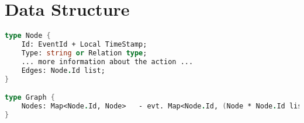 \section{Data Structure}\label{sec:datastructure}
\begin{lstlisting}[breaklines=true,language=FSharp]
type Node {
	Id: EventId + Local TimeStamp;
	Type: string or Relation type;
	... more information about the action ...
	Edges: Node.Id list;
}

type Graph {
	Nodes: Map<Node.Id, Node>	- evt. Map<Node.Id, (Node * Node.Id list)
}
\end{lstlisting}